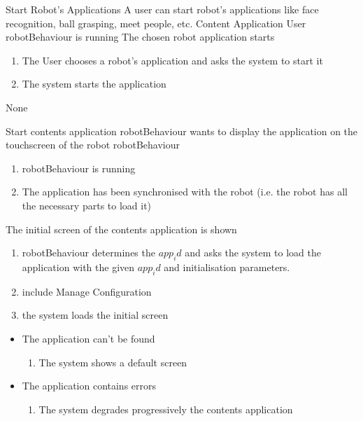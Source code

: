 \begin{suc}
{Start Robot's Applications}
{A user can start robot's applications like face recognition, ball grasping, meet people, etc.}
{Content Application User}
{robotBehaviour is running}
{The chosen robot application starts}
{
    \begin{enumerate}
        \item The User chooses a robot's application and asks the system to start it
        \item The system starts the application
    \end{enumerate}
}
{None}
\end{suc}

\begin{suc}
{Start contents application}
{robotBehaviour wants to display the application on the touchscreen of the robot}
{robotBehaviour}
{
	\begin{enumerate}
        \item robotBehaviour is running
        \item The application has been synchronised with the robot (i.e. the robot has all the necessary parts to load it)
    \end{enumerate}
}
{
The initial screen of the contents application is shown
}
{
    \begin{enumerate}
        \item robotBehaviour determines the $app_id$ and asks the system to load the application with the given $app_id$ and initialisation parameters.
        \item include Manage Configuration
		\item the system loads the initial screen
    \end{enumerate}
}
{    
	\begin{itemize}
        \item The application can't be found
        \begin{enumerate}
        	\item The system shows a default screen
    	\end{enumerate}
    	\item The application contains errors
        \begin{enumerate}
        	\item The system degrades progressively the contents application
    	\end{enumerate}
    \end{itemize}    
}
\end{suc}


